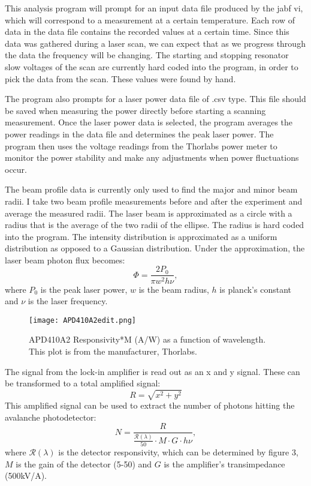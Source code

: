 \documentclass[12pt, a4paper]{article}
\begin{document}
This analysis program will prompt for an input data file produced by the jabf vi, which will correspond to a measurement at a certain temperature. Each row of data in the data file contains the recorded values at a certain time. Since this data was gathered during a laser scan, we can expect that as we progress through the data the frequency will be changing. The starting and stopping resonator slow voltages of the scan are currently hard coded into the program, in order to pick the data from the scan. These values were found by hand. 

The program also prompts for a laser power data file of .csv type. This file should be saved when measuring the power directly before starting a scanning measurement. Once the laser power data is selected, the program averages the power readings in the data file and determines the peak laser power. The program then uses the voltage readings from the Thorlabs power meter to monitor the power stability and make any adjustments when power fluctuations occur. 

The beam profile data is currently only used to find the major and minor beam radii. I take two beam profile measurements before and after the experiment and average the measured radii.  The laser beam is approximated as a circle with a radius that is the average of the two radii of the ellipse. The radius is hard coded into the program. The intensity distribution is approximated as a uniform distribution as opposed to a Gaussian distribution. Under the approximation, the laser beam photon flux becomes:
\begin{equation}
\Phi = \frac{2P_0}{\pi w^2 h \nu},
\end{equation}
where $P_0$ is the peak laser power, $w$ is the beam radius, $h$ is planck's constant and $\nu$ is the laser frequency.

\begin{wrapfigure}{r}{0.45\textwidth}
  \texttt{[image: APD410A2edit.png]}
  \vspace*{-3mm}
  \caption{APD410A2 Responsivity*M (A/W) as a function of wavelength. This plot is from the manufacturer, Thorlabs.}
\end{wrapfigure}

The signal from the lock-in amplifier is read out as an x and y signal. These can be transformed to a total amplified signal:
\begin{equation}
R = \sqrt{x^2+y^2}
\end{equation}
This amplified signal can be used to extract the number of photons hitting the avalanche photodetector:
\begin{equation}
N = \frac{R}{\frac{\mathcal{R}(\lambda)}{50}\cdot M\cdot G \cdot h\nu},
\end{equation}
where $\mathcal{R}(\lambda)$ is the detector responsivity, which can be determined by figure 3, $M$ is the gain of the detector (5-50) and $G$ is the amplifier's transimpedance (500kV/A).
\end{document}
